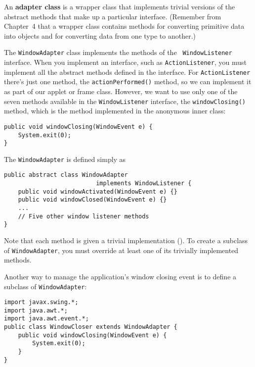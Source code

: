 An {\bf adapter class} is a wrapper class that implements trivial
versions of the abstract methods that make up a particular
interface. (Remember from Chapter~4 that a wrapper class contains
methods for converting primitive data into objects and for
converting data from one type to another.)

The {\tt Window\-Adapter} class implements the methods of the {\tt
Window\-Listener} interface.  When you implement an interface, such as
{\tt ActionListener}, you must implement all the abstract methods
defined in the interface.  For {\tt ActionListener} there's just one
method, the {\tt actionPerformed()} method, so we can implement it as
part of our applet or frame class.  However, we want to use only one
of the seven methods available in the {\tt WindowListener} interface,
the {\tt windowClosing()} method, which is the method implemented in
the anonymous inner class:

\begin{jjjlisting}
\begin{lstlisting}
public void windowClosing(WindowEvent e) {
    System.exit(0);
}
\end{lstlisting}
\end{jjjlisting}

\noindent The {\tt WindowAdapter} is defined simply as

\begin{jjjlisting}
\begin{lstlisting}
public abstract class WindowAdapter 
                          implements WindowListener {
    public void windowActivated(WindowEvent e) {}
    public void windowClosed(WindowEvent e) {}
    ...
    // Five other window listener methods
}
\end{lstlisting}
\end{jjjlisting}

\noindent Note that each method is given a trivial implementation ({}).
To create a subclass of {\tt WindowAdapter}, you must override at
least one of its trivially implemented methods.

Another way to manage the application's window closing event
is to define a subclass of {\tt WindowAdapter}:

\begin{jjjlisting}
\begin{lstlisting}
import javax.swing.*;
import java.awt.*;
import java.awt.event.*;
public class WindowCloser extends WindowAdapter {
    public void windowClosing(WindowEvent e) {
        System.exit(0);
    }
}
\end{lstlisting}
\end{jjjlisting}

